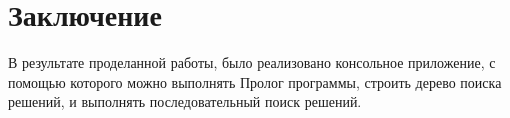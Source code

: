 \chapter{Заключение}
В результате проделанной работы, было реализовано консольное приложение, с помощью которого можно выполнять Пролог программы, строить дерево поиска решений, и выполнять последовательный поиск решений.